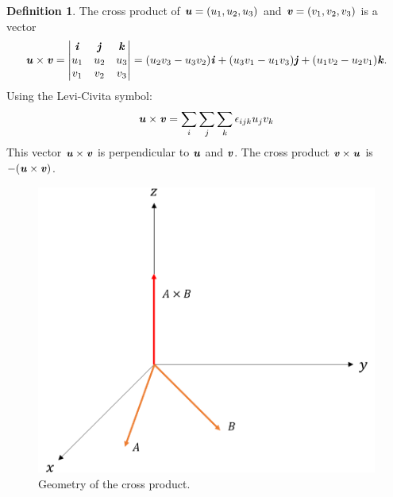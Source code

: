 \documentclass[12pt, letterpaper]{article}
\newcommand{\V}[1]{\textbf{\textit{#1}}}
\newcommand{\DefinitionSpace}{\vspace{15px}}
\theoremstyle{definition}
\newtheorem{definition}{Definition}[section]
\begin{document}
	\begin{definition}
		The cross product of $\V{u} = (u_1, u_2, u_3)$ and $\V{v} = (v_1, v_2, v_3)$ is a vector \begin{equation}
																									\V{u} \times \V{v} = \begin{vmatrix}
																															\V{i} & \V{j} &\V{k} \\
																															u_1 & u_2 & u_3 \\
																															v_1 & v_2 & v_3
																															\end{vmatrix} = 
																															(u_2v_3 - u_3v_2)\V{i} + 
																															(u_3v_1 - u_1v_3)\V{j} + 
																															(u_1v_2-u_2v_1)\V{k}.
																								\end{equation}
		Using the Levi-Civita symbol: \begin{equation*}
													\V{u} \times \V{v} = \sum_{i}\sum_{j}\sum_{k} \epsilon_{ijk} u_j v_k
											\end{equation*} This vector $\V{u} \times \V{v}$ is perpendicular to $\V{u}$ and $\V{v}$. The cross product $\V{v} \times \V{u}$ is $-(\V{u} \times \V{v})$.
	\end{definition}
	\DefinitionSpace
	
		\begin{figure}[h!]
			\centering
			\includegraphics[scale=0.3]{crossproduct_geometry.png}
			\caption{Geometry of the cross product.}
			\label{cross_prod_geom}
		\end{figure}
		
\end{document}
